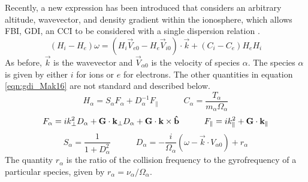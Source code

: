 Recently, a new expression has been introduced that considers an arbitrary altitude, wavevector, and density gradient within the ionosphere, which allows FBI, GDI, an CCI to be considered with a single dispersion relation \citep{Makarevich2016a}.
\begin{equation}
	\label{eqn:gdi_Mak16}
	(H_i-H_e)\omega = (H_i\vec{V}_{e0}-H_e\vec{V}_{i0})\cdot\vec{k}+(C_i-C_e)H_eH_i
\end{equation}
As before, \(\vec{k}\) is the wavevector and \(\vec{V}_{\alpha 0}\) is the velocity of species \(\alpha\).  The species \(\alpha\) is given by either \(i\) for ions or \(e\) for electrons.  The other quantities in equation \ref{eqn:gdi_Mak16} are not standard and described below.
\begin{equation}
	H_\alpha = S_\alpha F_\alpha + D_\alpha^{-1} F_\parallel \quad\quad\quad
	C_\alpha = \frac{T_\alpha}{m_\alpha \Omega_\alpha}
\end{equation}
\begin{equation}
	F_\alpha = i k_\perp^2 D_\alpha + \mathbf{G}\cdot\mathbf{k}_\perp D_\alpha + \mathbf{G}\cdot\mathbf{k}\times\mathbf{\hat{b}} \quad\quad\quad
	F_\parallel = i k_\parallel^2 + \mathbf{G}\cdot\mathbf{k}_\parallel
\end{equation}
\begin{equation}
	S_\alpha = \frac{1}{1+D_\alpha^2} \quad\quad\quad
	D_\alpha = -\frac{i}{\Omega_\alpha}(\omega-\vec{k}\cdot{V}_{\alpha 0})+r_\alpha
\end{equation}
The quantity \(r_\alpha\) is the ratio of the collision frequency to the gyrofrequency of a particular species, given by \(r_\alpha = \nu_\alpha/\Omega_\alpha\).  

